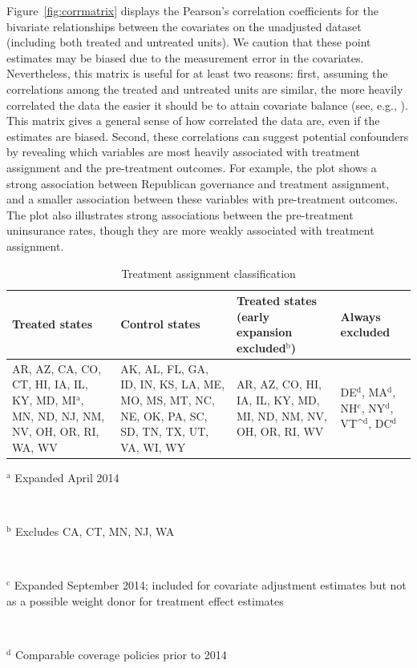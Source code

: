 Figure~\ref{fig:corrmatrix} displays the Pearson's correlation coefficients for the bivariate relationships between the covariates on the unadjusted dataset (including both treated and untreated units). We caution that these point estimates may be biased due to the measurement error in the covariates. Nevertheless, this matrix is useful for at least two reasons: first, assuming the correlations among the treated and untreated units are similar, the more heavily correlated the data the easier it should be to attain covariate balance (see, e.g., \cite{d2021overlap}). This matrix gives a general sense of how correlated the data are, even if the estimates are biased. Second, these correlations can suggest potential confounders by revealing which variables are most heavily associated with treatment assignment and the pre-treatment outcomes. For example, the plot shows a strong association between Republican governance and treatment assignment, and a smaller association between these variables with pre-treatment outcomes. The plot also illustrates strong associations between the pre-treatment uninsurance rates, though they are more weakly associated with treatment assignment. 

\begin{table}[h!]
\centering
\caption{Treatment assignment classification}\label{tab:txassign}
\begin{tabularx}{\textwidth}{|X|X|X|X|}  \hline
Treated states & Control states & Treated states (early expansion excluded$^\textrm{b}$) & Always excluded \\
  \hline
AR, AZ, CA, CO, CT, HI, IA, IL, KY, MD, MI$^\textrm{a}$, MN, ND, NJ, NM, NV, OH, OR, RI, WA, WV & AK, AL, FL, GA, ID, IN, KS, LA, ME, MO, MS, MT, NC, NE, OK, PA, SC, SD, TN, TX, UT, VA, WI, WY & AR, AZ, CO, HI, IA, IL, KY, MD, MI, ND, NM, NV, OH, OR, RI, WV & DE$^\textrm{d}$, MA$^\textrm{d}$, NH$^\textrm{c}$, NY$^\textrm{d}$, VT^$^\textrm{d}$, DC$^\textrm{d}$ \\ 
   \hline
\end{tabularx}
     \vspace{1ex}

     {\raggedright $^\textrm{a}$ Expanded April 2014 \par \\
     \raggedright $^\textrm{b}$ Excludes CA, CT, MN, NJ, WA \par \\
     \raggedright $^\textrm{c}$ Expanded September 2014; included for covariate adjustment estimates but not as a possible weight donor for treatment effect estimates \par \\
    \raggedright $^\textrm{d}$ Comparable coverage policies prior to 2014 \par}
\end{table}

